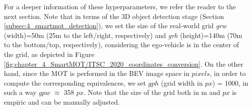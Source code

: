 \begin{table}[h]
	\captionsetup{justification=justified}
	\caption[Comparative of Multi-Object Tracking pipelines using the KITTI-3DMOT evaluation tool in the validation set (car class)]{Comparative of Multi-Object Tracking pipelines using the KITTI-3DMOT evaluation tool in the validation set (car class). We bold the best results in \textbf{black} and the second best in  for each metric.}
	\label{table:4_MOT_pipelines_validation}
	\centering
\end{table}

For a deeper information of these hyperparameters, we refer the reader to the next section. Note that in terms of the 3D object detection stage (Section \ref{subsec:4_smartmot_detection}), we set the size of the real-world grid \textit{grw} (width)=50m (25m to the left/right, respectively) and \textit{grh} (height)=140m (70m to the bottom/top, respectively), considering the ego-vehicle is in the center of the grid, as depicted in Figure \ref{fig:chapter_4_SmartMOT/ITSC_2020_coordinates_conversion}. On the other hand, since the \ac{MOT} is performed in the \ac{BEV} image space in $pixels$, in order to compute the corresponding equivalences, we set $gph$ (grid width in $px$) = 1000, in such a way $gpw$ $\approx$ 358 $px$. Note that the size of the grid both in m and $px$ is empiric and can be manually adjusted.  

